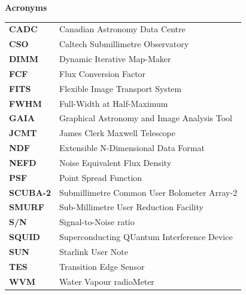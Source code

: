 \documentclass[twoside,11pt]{article}
\newenvironment{latexonly}{}{}
\renewcommand{\_}{\texttt{\symbol{95}}}
\begin{document}
\newpage
\begin{latexonly}

   \vspace{10mm}
   \begin{center}
      {\Large\textbf{Acronyms}}
   \end{center}

\setlength{\extrarowheight}{3pt}
\begin{table}[h!]
\begin{tabular}{ll}
\textbf{CADC}   & Canadian Astronomy Data Centre\\
\textbf{CSO}    & Caltech Submillimetre Observatory\\
\textbf{DIMM}   & Dynamic Iterative Map-Maker\\
\textbf{FCF}    & Flux Conversion Factor\\
\textbf{FITS}   & Flexible Image Transport System\\
\textbf{FWHM}   & Full-Width at Half-Maximum\\
\textbf{GAIA}   & Graphical Astronomy and Image Analysis Tool\\
\textbf{JCMT}   & James Clerk Maxwell Telescope\\
\textbf{NDF}    & Extensible N-Dimensional Data Format\\
\textbf{NEFD}   & Noise Equivalent Flux Density\\
\textbf{PSF}    & Point Spread Function\\
\textbf{SCUBA-2}& Submillimetre Common User Bolometer Array-2\\
\textbf{SMURF}  & Sub-Millimetre User Reduction Facility\\
\textbf{S/N}    & Signal-to-Noise ratio\\
\textbf{SQUID}  & Superconducting QUantum Interference Device\\
\textbf{SUN}    & Starlink User Note\\
\textbf{TES}    & Transition Edge Sensor\\
\textbf{WVM}    & Water Vapour radioMeter\\
\end{tabular}
\end{table}

\end{latexonly}

\end{document}
